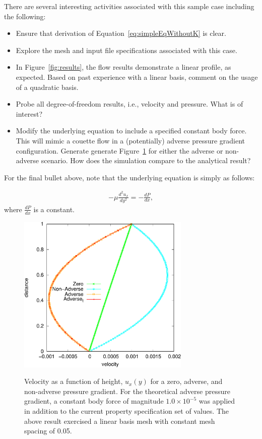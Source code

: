 \documentclass{article}
\begin{document}
There are several interesting activities associated with this sample case including
the following:

\begin{itemize}
	\item Ensure that derivation of Equation~\ref{eq:simpleEqWithoutK} is clear.
	\item Explore the mesh and input file specifications associated with this case.
	\item In Figure~\ref{fig:results}, the flow results demonstrate a linear profile, as 
          expected. Based on past experience with a linear basis, comment on the usage of a quadratic
          basis.
        \item Probe all degree-of-freedom results, i.e., velocity and pressure. What is of interest?
        \item Modify the underlying equation to include a specified constant body force. This will mimic
          a couette flow in a (potentially) adverse pressure gradient configuration. Generate generate
          Figure~\ref{fig:analytical} for either the adverse or non-adverse scenario. How does the simulation
          compare to the analytical result?
\end{itemize}

For the final bullet above, note that the underlying equation is simply as follows:

\begin{align}
   -\mu \frac{d^2 u_x}{dy^2} = -\frac{dP}{dx},
\label{eq:simpEqP}
\end{align}
where $\frac{dP}{dx}$ is a constant.

\begin{figure}[!htbp]
  \centering
  {
   \includegraphics[height=3.0in]{images/couette-crop.pdf}
  }
  \caption{Velocity as a function of height, $u_x(y)$ for a zero, adverse, and non-adverse pressure gradient. For the theoretical
    adverse pressure gradient, a constant body force of magnitude $1.0 \times 10^{-5}$ was applied in addition to the current
    property specification set of values. The above result exercised a linear basis mesh with constant mesh spacing of 0.05.}
  \label{fig:analytical}
\end{figure}
\end{document}
